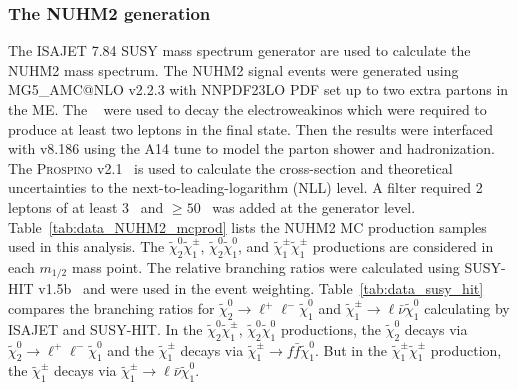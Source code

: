 \subsubsection{The NUHM2 generation}
\label{subsubsec:data_NUHM2_generation}
The \textsc{ISAJET} 7.84 SUSY mass spectrum generator are used to calculate the NUHM2 mass spectrum.
The NUHM2 signal events were generated using MG5\_{\scriptsize A}MC@NLO v2.2.3 with NNPDF23LO PDF set up to two extra partons in the ME.
The {\MADSPIN}~\cite{Artoisenet:2012st} were used to decay the electroweakinos which were required to produce at least two leptons in the final state.
Then the results were interfaced with {\PYTHIA} v8.186 using the A14 tune to model the parton shower and hadronization.
The \textsc{Prospino} v2.1~\cite{Beenakker:1996ed} is used to calculate the cross-section and theoretical uncertainties to the next-to-leading-logarithm (NLL) level.
A filter required 2 leptons of at least 3~{\GeV} and \met $\ge 50$~{\GeV} was added at the generator level.
Table~\ref{tab:data_NUHM2_mcprod} lists the NUHM2 MC production samples used in this analysis.
The $\widetilde{\chi}^{0}_{2} \widetilde{\chi}^{\pm}_{1}$, $\widetilde{\chi}^{0}_{2} \widetilde{\chi}^{0}_{1}$, and $\widetilde{\chi}^{\pm}_{1} \widetilde{\chi}^{\pm}_{1}$ productions are considered in each $m_{1/2}$ mass point.
The relative branching ratios were calculated using SUSY-HIT v1.5b~\cite{Djouadi:2006bz} and were used in the event weighting.
Table~\ref{tab:data_susy_hit} compares the branching ratios for $\widetilde{\chi}^{0}_{2} \to \ell^{+} \ell^{-} \widetilde{\chi}^{0}_{1}$ and $\widetilde{\chi}^{\pm}_{1} \to \ell \bar{\nu} \widetilde{\chi}^{0}_{1}$ calculating by \textsc{ISAJET} and SUSY-HIT.
In the $\widetilde{\chi}^{0}_{2} \widetilde{\chi}^{\pm}_{1}$, $\widetilde{\chi}^{0}_{2} \widetilde{\chi}^{0}_{1}$ productions, the $\widetilde{\chi}^{0}_{2}$ decays via $\widetilde{\chi}^{0}_{2} \to \ell^{+} \ell^{-} \widetilde{\chi}^{0}_{1}$ and the $\widetilde{\chi}^{\pm}_{1}$ decays via $\widetilde{\chi}^{\pm}_{1} \to f\bar{f} \widetilde{\chi}^{0}_{1}$.
But in the $\widetilde{\chi}^{\pm}_{1} \widetilde{\chi}^{\pm}_{1}$ production, the $\widetilde{\chi}^{\pm}_{1}$ decays via $\widetilde{\chi}^{\pm}_{1} \to \ell \bar{\nu} \widetilde{\chi}^{0}_{1}$.

